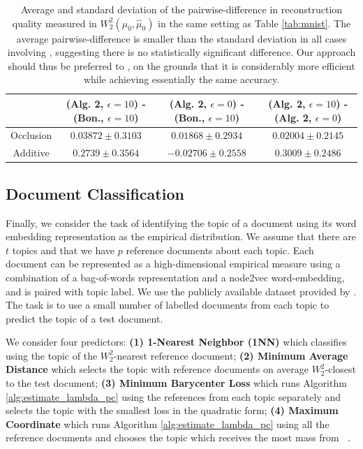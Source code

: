 \documentclass[nohyperref]{article}
\DeclareMathOperator*{\hatlambda}{\hat{\lambda}}
\theoremstyle{definition}
\begin{document}
\begin{table}[]
    \centering
    \begin{tabular}{c|c|c|c|}
    \cline{2-4}
        & (Alg. 2, $\epsilon=10$) - (Bon., $\epsilon = 10$) & (Alg. 2, $\epsilon=0$) - (Bon., $\epsilon = 10$) & (Alg. 2, $\epsilon=10$) - (Alg. 2, $\epsilon=0$) \\
        \hline 
        \multicolumn{1}{|c|}{Occlusion}  &    $0.03872 \pm 0.3103$    &    $0.01868 \pm 0.2934$   &     $0.02004 \pm 0.2145$    \\
        \hline 
        \multicolumn{1}{|c|}{Additive}   &    $0.2739 \pm 0.3564$     &   $-0.02706 \pm 0.2558$   &     $0.3009 \pm 0.2486$  \\
        \hline
    \end{tabular}
    \caption{Average and standard deviation of the pairwise-difference in reconstruction quality measured in $W_2^2(\mu_0, \hat{\mu}_0)$ in the same setting as Table \ref{tab:mnist}. The average pairwise-difference is smaller than the standard deviation in all cases involving \cite{bonneel2016coordinates}, suggesting there is no statistically significant difference.  Our approach should thus be preferred to \cite{bonneel2016coordinates}, on the grounds that it is considerably more efficient while achieving essentially the same accuracy.}
    \label{tab:mnist_comp}
\end{table}

\subsection{Document Classification}

Finally, we consider the task of identifying the topic of a document using its word embedding representation as the empirical distribution. We assume that there are $t$ topics and that we have $p$ reference documents about each topic. Each document can be represented as a high-dimensional empirical measure using a combination of a bag-of-words representation and a node2vec \cite{mikolov2013distributed} word-embedding, and is paired with topic label. We use the publicly available dataset provided by \cite{huang2016supervised}. The task is to use a small number of labelled documents from each topic to predict the topic of a test document.

We consider four predictors: \textbf{(1) 1-Nearest Neighbor (1NN)} which classifies using the topic of the $W_2^2$-nearest reference document; \textbf{(2) Minimum Average Distance} which selects the topic with reference documents on average $W_2^2$-closest to the test document; \textbf{(3) Minimum Barycenter Loss} which runs Algorithm \ref{alg:estimate_lambda_pc} using the references from each topic separately and selects the topic with the smallest loss in the quadratic form; \textbf{(4) Maximum Coordinate} which runs Algorithm \ref{alg:estimate_lambda_pc} using all the reference documents and chooses the topic which receives the most mass from $\hatlambda$. 
\end{document}
